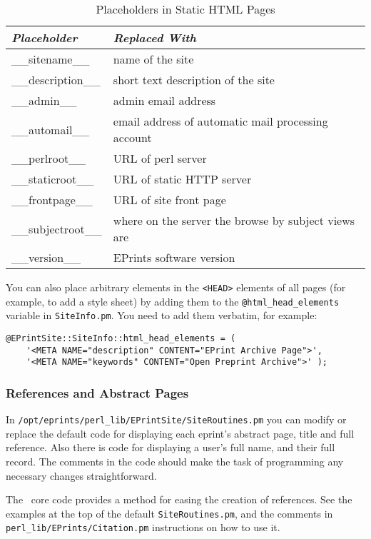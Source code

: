 \begin{table}
\begin{center}
\begin{tabular}{|l|l|}
\hline
\emph{Placeholder}  & \emph{Replaced With}                                \\
\hline 
\_\_sitename\_\_    & name of the site                                    \\
\_\_description\_\_ & short text description of the site                  \\
\_\_admin\_\_       & admin email address                                 \\
\_\_automail\_\_    & email address of automatic mail processing account  \\
\_\_perlroot\_\_    & URL of perl server                                  \\
\_\_staticroot\_\_  & URL of static HTTP server                           \\
\_\_frontpage\_\_   & URL of site front page                              \\
\_\_subjectroot\_\_ & where on the server the browse by subject views are \\
\_\_version\_\_     & EPrints software version                            \\
\hline
\end{tabular}
\caption{\label{install_placeholders} Placeholders in Static HTML Pages}
\end{center}
\end{table}

You can also place arbitrary elements in the {\tt <HEAD>} elements of all pages (for example, to add a style sheet) by adding them to the {\tt @html\_head\_elements} variable in {\tt SiteInfo.pm}. You need to add them verbatim, for example:

\begin{verbatim}
@EPrintSite::SiteInfo::html_head_elements = (
	'<META NAME="description" CONTENT="EPrint Archive Page">',
	'<META NAME="keywords" CONTENT="Open Preprint Archive">' );
\end{verbatim}


\subsubsection{References and Abstract Pages}

In {\tt /opt/eprints/perl\_lib/EPrintSite/SiteRoutines.pm} you can modify or replace the default code for displaying each eprint's abstract page, title and full reference. Also there is code for displaying a user's full name, and their full record. The comments in the code should make the task of programming any necessary changes straightforward.

The \eprints\ core code provides a method for easing the creation of references. See the examples at the top of the default {\tt SiteRoutines.pm}, and the comments in {\tt perl\_lib/EPrints/Citation.pm} instructions on how to use it.
